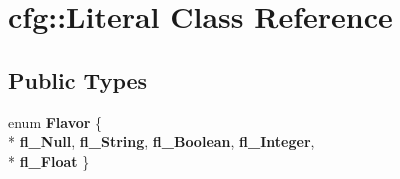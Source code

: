 \hypertarget{classcfg_1_1Literal}{\section{cfg\-:\-:Literal Class Reference}
\label{classcfg_1_1Literal}
}
\subsection*{Public Types}
\begin{DoxyCompactItemize}
\item 
enum {\bfseries Flavor} \{ \\*
{\bfseries fl\-\_\-\-Null}, 
{\bfseries fl\-\_\-\-String}, 
{\bfseries fl\-\_\-\-Boolean}, 
{\bfseries fl\-\_\-\-Integer}, 
\\*
{\bfseries fl\-\_\-\-Float}
 \}
\end{DoxyCompactItemize}
